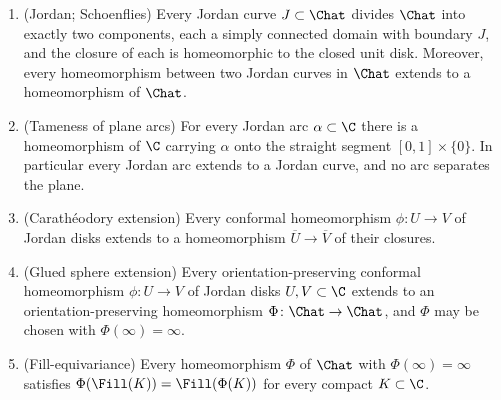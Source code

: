 \begin{proposition}\label{prop:A-extension}
\leavevmode
\begin{enumerate}
\item \textup{(Jordan; Schoenflies)}  Every Jordan curve
$J\subset\Chat$ divides $\Chat$ into exactly two components, each a
simply connected domain with boundary $J$, and the closure of each is
homeomorphic to the closed unit disk.  Moreover, every homeomorphism
between two Jordan curves in $\Chat$ extends to a homeomorphism of
$\Chat$.
\item \textup{(Tameness of plane arcs)}  For every Jordan arc
$\alpha\subset\C$ there is a homeomorphism of $\C$ carrying $\alpha$ onto
the straight segment $[0,1]\times\{0\}$.  In particular every Jordan arc
extends to a Jordan curve, and no arc separates the plane.
\item \textup{(Carath\'eodory extension)}  Every conformal homeomorphism
$\phi\colon U\to V$ of Jordan disks extends to a homeomorphism
$\overline{U}\to\overline{V}$ of their closures.
\item \textup{(Glued sphere extension)}  Every orientation-preserving
conformal homeomorphism $\phi\colon U\to V$ of Jordan disks
$U,V\subset\C$ extends to an orientation-preserving homeomorphism
$\Phi\colon\Chat\to\Chat$, and $\Phi$ may be chosen with
$\Phi(\infty)=\infty$.
\item \textup{(Fill-equivariance)}  Every homeomorphism $\Phi$ of
$\Chat$ with $\Phi(\infty)=\infty$ satisfies
$\Phi(\Fill(K))=\Fill(\Phi(K))$ for every compact $K\subset\C$.
\end{enumerate}
\end{proposition}

